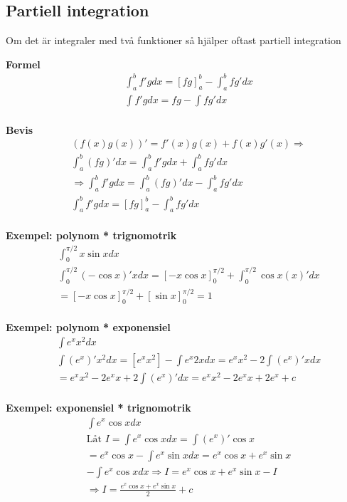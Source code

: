 \begin{multicols}{2}
\subsection{Partiell integration}
Om det är integraler med två funktioner så hjälper oftast partiell integration

\textbf{Formel}
\begin{align*}
  &\int_a^b f'g dx={[fg]}_a^b-\int_a^b fg' dx \\
  &\int f'g dx= fg-\int fg' dx \\
\end{align*}

\textbf{Bevis}
\begin{align*}
  &(f(x)g(x))'=f'(x)g(x)+f(x)g'(x) \Rightarrow \\
  &\int_a^b (fg)' dx= \int_a^b f'g dx + \int_a^b fg' dx \\
  &\Rightarrow  \int_a^b f'g dx = \int_a^b (fg)' dx - \int_a^b fg' dx \\
  &\int_a^b f'g dx={[fg]}_a^b-\int_a^b fg' dx \\
\end{align*}


\textbf{Exempel: polynom * trignomotrik}
\begin{align*}
  &\int_0^{\pi/2} x\sin{x} dx \\
  &\int_0^{\pi/2} (-\cos{x})'x dx = {[-x\cos{x}]}_0^{\pi/2}+\int_0^{\pi/2} \cos{x}(x)' dx  \\
  &={[-x\cos{x}]}_0^{\pi/2} + {[\sin{x}]}_0^{\pi/2}=1 \\
\end{align*}

\textbf{Exempel: polynom * exponensiel}
\begin{align*}
  &\int e^x x^2 dx \\
  &\int (e^x)' x^2 dx = [e^x x^2] - \int e^x 2x dx = e^x x^2 - 2 \int (e^x)' x dx \\
  &= e^x x^2 - 2e^x x + 2\int (e^x)' dx = e^x x^2 - 2e^x x + 2e^x +c \\
\end{align*}

\textbf{Exempel: exponensiel * trignomotrik}
\begin{align*}
  &\int e^x\cos{x} dx \\
  &\text{Låt } I = \int e^x\cos{x} dx = \int {(e^x)}'\cos{x} \\
  &= e^x\cos{x} - \int e^x\sin{x}dx = e^x\cos{x} + e^x\sin{x} \\
  &- \int e^x\cos{x}dx \Rightarrow I = e^x\cos{x}+e^{x}\sin{x}-I \\
  &\Rightarrow I = \frac{e^x\cos{x}+e^{x}\sin{x}}{2} + c
\end{align*}


\end{multicols}
